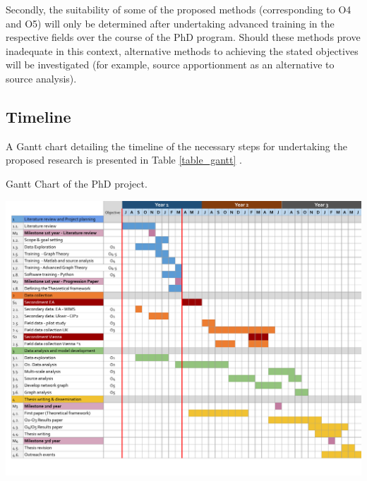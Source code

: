\documentclass{article}
\begin{document}
Secondly, the suitability of some of the proposed methods (corresponding to O4 and O5) will only be determined after undertaking advanced training in the respective fields over the course of the PhD program. Should these methods prove inadequate in this context, alternative methods to achieving the stated objectives will be investigated (for example, source apportionment \citep{Gasperi2010ContributionsSystems,Giglioli2020SourceNaples} as an alternative to source analysis).

\subsection{Timeline}
 A Gantt chart detailing the timeline of the necessary steps for undertaking the proposed research is presented in Table \ref{table_gantt} \footnotemark .
 
 
\begin{landscape}
\begin{table}
    \caption{Gantt Chart of the PhD project.}
    \includegraphics[width=20cm,
    trim=0cm 0cm 0cm 0cm, clip ]{table_gantt.pdf}
    
    
    \label{table_gantt}
\end{table}
\end{landscape}
\end{document}
